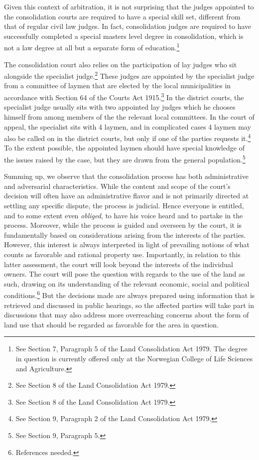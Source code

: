 Given this context of arbitration, it is not surprising that the judges appointed to the consolidation courts are required to have a special skill set, different from that of regular civil law judges. In fact, consolidation judges are required to have successfully completed a special masters level degree in consolidation, which is not a law degree at all but a separate form of education.\footnote{See Section 7, Paragraph 5 of the Land Consolidation Act 1979. The degree in question is currently offered only at the Norwegian College of Life Sciences and Agriculture.} 

The consolidation court also relies on the participation of lay judges who sit alongside the specialist judge.\footnote{See Section 8 of the Land Consolidation Act 1979.} These judges are appointed by the specialist judge from a committee of laymen that are elected by the local municipalities in accordance with Section 64 of the Courts Act 1915.\footnote{See Section 8 of the Land Consolidation Act 1979.} In the district courts, the specialist judge usually sits with two appointed lay judges which he chooses himself from among members of the the relevant local committees. In the court of appeal, the specialist sits with 4 laymen, and in complicated cases 4 laymen may also be called on in the district courts, but only if one of the parties requests it.\footnote{See Section 9, Paragraph 2 of the Land Consolidation Act 1979.} To the extent possible, the appointed laymen should have special knowledge of the issues raised by the case, but they are drawn from the general population.\footnote{See Section 9, Paragraph 5.}

Summing up, we observe that the consolidation process has both administrative and adversarial characteristics. While the content and scope of the court's decision will often have an administrative flavor and is not primarily directed at settling any specific dispute, the process is judicial. Hence everyone is entitled, and to some extent even \emph{obliged}, to have his voice heard and to partake in the process. Moreover, while the process is guided and overseen by the court, it is fundamentally based on considerations arising from the interests of the parties. However, this interest is always interpreted in light of prevailing notions of what counts as favorable and rational property use. Importantly, in relation to this latter assessment, the court will look beyond the interests of the individual owners. The court will pose the question with regards to the use of the land as such, drawing on its understanding of the relevant economic, social and political conditions.\footnote{References needed.} But the decisions made are always prepared using information that is retrieved and discussed in public hearings, so the affected parties will take part in discussions that may also address more overreaching concerns about the form of land use that should be regarded as favorable for the area in question.

